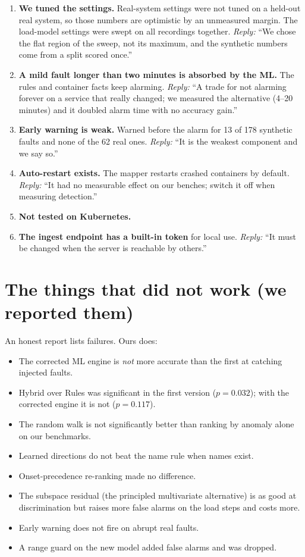 \begin{enumerate}
\item \textbf{We tuned the settings.} Real-system settings were not tuned on a held-out real system, so those numbers are optimistic by an unmeasured margin. The load-model settings were swept on all recordings together. \emph{Reply:} ``We chose the flat region of the sweep, not its maximum, and the synthetic numbers come from a split scored once.''

\item \textbf{A mild fault longer than two minutes is absorbed by the ML.} The rules and container facts keep alarming. \emph{Reply:} ``A trade for not alarming forever on a service that really changed; we measured the alternative (4--20 minutes) and it doubled alarm time with no accuracy gain.''

\item \textbf{Early warning is weak.} Warned before the alarm for 13 of 178 synthetic faults and none of the 62 real ones. \emph{Reply:} ``It is the weakest component and we say so.''

\item \textbf{Auto-restart exists.} The mapper restarts crashed containers by default. \emph{Reply:} ``It had no measurable effect on our benches; switch it off when measuring detection.''

\item \textbf{Not tested on Kubernetes.}

\item \textbf{The ingest endpoint has a built-in token} for local use. \emph{Reply:} ``It must be changed when the server is reachable by others.''
\end{enumerate}

\section{The things that did not work (we reported them)}
\begin{simplebox}
An honest report lists failures. Ours does:

\begin{itemize}
\item The corrected ML engine is \emph{not} more accurate than the first at catching injected faults.
\item Hybrid over Rules was significant in the first version ($p=0.032$); with the corrected engine it is not ($p=0.117$).
\item The random walk is not significantly better than ranking by anomaly alone on our benchmarks.
\item Learned directions do not beat the name rule when names exist.
\item Onset-precedence re-ranking made no difference.
\item The subspace residual (the principled multivariate alternative) is as good at discrimination but raises more false alarms on the load steps and costs more.
\item Early warning does not fire on abrupt real faults.
\item A range guard on the new model added false alarms and was dropped.
\end{itemize}
\end{simplebox}

